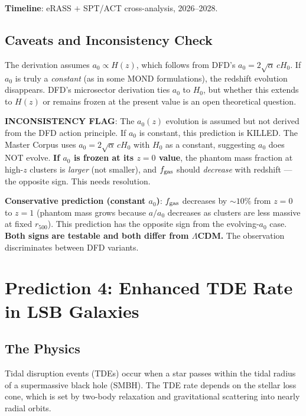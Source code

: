 \documentclass[11pt]{article}
\newcommand{\LCDM}{$\Lambda$CDM}
\begin{document}
\textbf{Timeline}: eRASS $+$ SPT/ACT cross-analysis, 2026--2028.

\subsection{Caveats and Inconsistency Check}

The derivation assumes $a_0 \propto H(z)$, which follows from DFD's
$a_0 = 2\sqrt{\alpha}\,cH_0$. If $a_0$ is truly a \emph{constant} (as in
some MOND formulations), the redshift evolution disappears. DFD's
microsector derivation ties $a_0$ to $H_0$, but whether this extends to
$H(z)$ or remains frozen at the present value is an open theoretical
question.

\textbf{INCONSISTENCY FLAG}: The $a_0(z)$ evolution is assumed but not
derived from the DFD action principle. If $a_0$ is constant, this prediction
is KILLED. The Master Corpus uses $a_0 = 2\sqrt{\alpha}\,cH_0$ with $H_0$
as a constant, suggesting $a_0$ does NOT evolve. \textbf{If $a_0$ is frozen
at its $z=0$ value}, the phantom mass fraction at high-$z$ clusters is
\emph{larger} (not smaller), and $f_{\rm gas}$ should \emph{decrease} with
redshift --- the opposite sign. This needs resolution.

\textbf{Conservative prediction (constant $a_0$)}: $f_{\rm gas}$ decreases
by $\sim 10\%$ from $z = 0$ to $z = 1$ (phantom mass grows because $a/a_0$
decreases as clusters are less massive at fixed $r_{500}$). This prediction
has the opposite sign from the evolving-$a_0$ case. \textbf{Both signs are
testable and both differ from \LCDM.} The observation discriminates between
DFD variants.

\section{Prediction 4: Enhanced TDE Rate in LSB Galaxies}
\label{sec:tde}

\subsection{The Physics}

Tidal disruption events (TDEs) occur when a star passes within the tidal
radius of a supermassive black hole (SMBH). The TDE rate depends on the
stellar loss cone, which is set by two-body relaxation and gravitational
scattering into nearly radial orbits.
\end{document}
